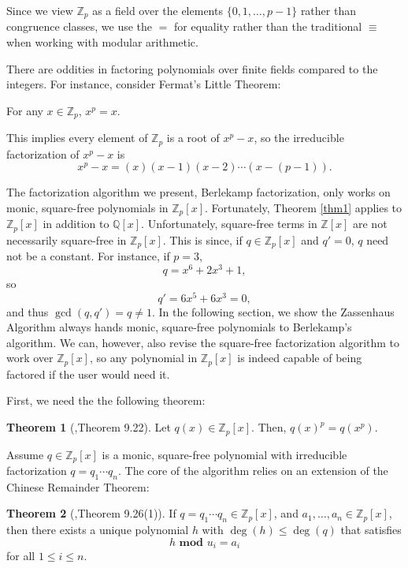 \documentclass{article}
\theoremstyle{definition}
\newtheorem{thm}{Theorem}[section]
\begin{document}
    Since we view $\mathbb{Z}_p$ as a field over the elements $\{0, 1,\ldots, p-1\}$ rather than congruence classes, we use the $=$ for equality rather than the traditional $\equiv$ when working with modular arithmetic. 
    
    There are oddities in factoring polynomials over finite fields compared to the integers. For instance, consider Fermat's Little Theorem:
    
    \begin{center}
        For any $x \in \mathbb{Z}_p$, $x^p = x$.
    \end{center}
    
    This implies every element of $\mathbb{Z}_p$ is a root of $x^p - x$, so the irreducible factorization of $x^p - x$ is \[x^p - x = (x)(x-1)(x-2) \cdots (x-(p-1)). \]
    
    The factorization algorithm we present, Berlekamp factorization, only works on monic, square-free polynomials in $\mathbb{Z}_p[x]$. Fortunately, Theorem \ref{thm1} applies to $\mathbb{Z}_p[x]$ in addition to $\mathbb{Q}[x]$. Unfortunately, square-free terms in $\mathbb{Z}[x]$ are not necessarily square-free in $\mathbb{Z}_p[x]$. This is since, if $q \in \mathbb{Z}_p[x]$ and $q' = 0$, $q$ need not be a constant. For instance, if $p = 3$, \[q = x^6 + 2x^3 + 1,\] so \[q' = 6x^5 + 6x^3 = 0,\] and thus $\gcd(q, q') = q \neq 1$. In the following section, we show the Zassenhaus Algorithm always hands monic, square-free polynomials to Berlekamp's algorithm. We can, however, also revise the square-free factorization algorithm to work over $\mathbb{Z}_p[x]$, so any polynomial in $\mathbb{Z}_p[x]$ is indeed capable of being factored if the user would need it.
    
    First, we need the the following theorem:
    
    \begin{thm}[\cite{casc1},Theorem 9.22]
        Let $q(x) \in \mathbb{Z}_p[x]$. Then, $q(x)^p = q(x^p)$.
    \end{thm}
    
    Assume $q \in \mathbb{Z}_p[x]$ is a monic, square-free polynomial with irreducible factorization $q = q_1\cdots q_n$. The core of the algorithm relies on an extension of the Chinese Remainder Theorem:
    
    \begin{thm}[\cite{casc1},Theorem 9.26(1)] \label{thm2}
        If $q = q_1\cdots q_n \in \mathbb{Z}_p[x]$, and $a_1, \ldots, a_n \in \mathbb{Z}_p[x]$, then there exists a unique polynomial $h$ with $\deg(h) \leq \deg(q)$ that satisfies \[h \textbf{ mod } u_i = a_i\] for all $1\leq i \leq n$.
    \end{thm}
    
\end{document}
